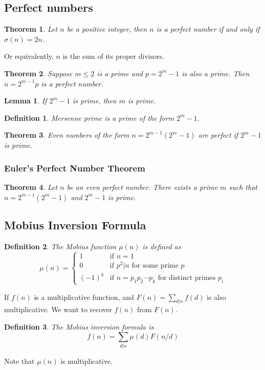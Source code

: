 \documentclass[letterpaper,12pt,oneside]{article}
\newtheorem{theorem}{Theorem}
\newtheorem{definition}{Definition}
\newtheorem*{lemma}{Lemma}
\begin{document}
\subsection{Perfect numbers}
\begin{theorem}
    Let $n$ be a positive integer, then $n$ is a perfect number if and only if $\sigma(n) = 2n$.
\end{theorem}
Or equivalently, $n$ is the sum of its proper divisors.
\begin{theorem}
    Suppose $m\leq 2$ is a prime and $p=2^m-1$ is also a prime. Then $n=2^{m-1}p$ is a perfect number.
\end{theorem}
\begin{lemma}
    If $2^m-1$ is prime, then $m$ is prime.
\end{lemma}
\begin{definition}
    Mersenne prime is a prime of the form $2^m-1$.
\end{definition}
\begin{theorem}
    Even numbers of the form $n=2^{m-1}(2^m-1)$ are perfect if $2^m-1$ is prime.
\end{theorem}
\subsubsection{Euler's Perfect Number Theorem}
\begin{theorem}
    Let $n$ be an even perfect number. There exists a prime $m$ such that $n = 2^{m-1}(2^m-1)$ and $2^m-1$ is prime.
\end{theorem}
\subsection{Mobius Inversion Formula}
\begin{definition}
    The Mobius function $\mu(n)$ is defined as \[
        \mu(n) = \begin{cases}
            1 & \text{if } n=1\\
            0 & \text{if } p^2|n \text{ for some prime } p\\
            (-1)^k & \text{if } n = p_1p_2\cdots p_k \text{ for distinct primes } p_i
        \end{cases}
    \]
\end{definition}
If $f(n)$ is a multiplicative function, and $F(n) = \sum_{d|n} f(d)$ is also multiplicative. We want to recover $f(n)$ from $F(n)$.
\begin{definition}
    The Mobius inversion formula is \[
        f(n) = \sum_{d|n} \mu(d)F(n/d)
    \]
\end{definition}
Note that $\mu(n)$ is multiplicative.
\end{document}
